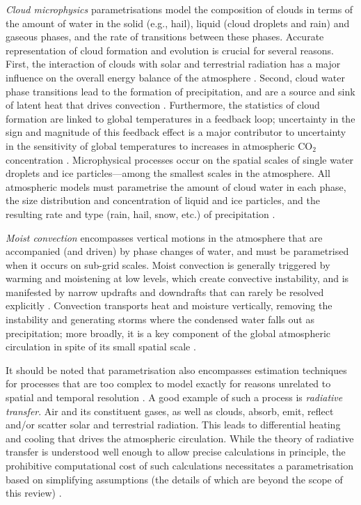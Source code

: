 \documentclass[titlepage]{article}
\numberwithin{equation}{section}
\begin{document}
\emph{Cloud microphysics} parametrisations model the composition of clouds in
terms of the amount of water in the solid (e.g., hail), liquid (cloud droplets
and rain) and gaseous phases, and the rate of transitions between these phases.
Accurate representation of cloud formation and evolution is crucial for several
reasons. First, the interaction of clouds with solar and terrestrial radiation
has a major influence on the overall energy balance of the atmosphere
\parencite{mcfarlane2011}. Second, cloud water phase transitions lead to the
formation of precipitation, and are a source and sink of latent heat that
drives convection \parencite{mcfarlane2011}. Furthermore, the statistics of
cloud formation are linked to global temperatures in a feedback loop;
uncertainty in the sign and magnitude of this feedback effect is a major
contributor to uncertainty in the sensitivity of global temperatures to
increases in atmospheric CO$_2$ concentration \parencite{andrews2012,
christensen2022,stevens2013}. Microphysical processes occur on the spatial
scales of single water droplets and ice particles---among the smallest scales
in the atmosphere. All atmospheric models must parametrise the amount of cloud
water in each phase, the size distribution and concentration of liquid and ice
particles, and the resulting rate and type (rain, hail, snow, etc.) of
precipitation \parencite{christensen2022}.

\emph{Moist convection} encompasses vertical motions in the atmosphere that are
accompanied (and driven) by phase changes of water, and must be parametrised
when it occurs on sub-grid scales. Moist convection is generally triggered by
warming and moistening at low levels, which create convective instability, and
is manifested by narrow updrafts and downdrafts that can rarely be resolved
explicitly \parencite{mcfarlane2011}. Convection transports heat and moisture
vertically, removing the instability and generating storms where the condensed
water falls out as precipitation; more broadly, it is a key component of the
global atmospheric circulation in spite of its small spatial scale
\parencite{christensen2022}.

It should be noted that parametrisation also encompasses estimation techniques
for processes that are too complex to model exactly for reasons unrelated to
spatial and temporal resolution \parencite{mcfarlane2011}. A good example of
such a process is \emph{radiative transfer}. Air and its constituent gases, as
well as clouds, absorb, emit, reflect and/or scatter solar and terrestrial
radiation. This leads to differential heating and cooling that drives the
atmospheric circulation. While the theory of radiative transfer is understood
well enough to allow precise calculations in principle, the prohibitive
computational cost of such calculations necessitates a parametrisation based on
simplifying assumptions (the details of which are beyond the scope of this
review) \parencite{christensen2022}.
\end{document}
